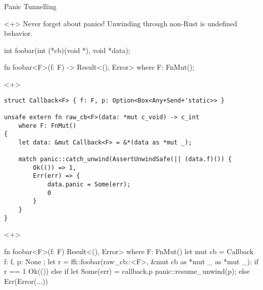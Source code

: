 \documentclass{beamer}
\begin{document}
\begin{frame}[fragile]{Panic Tunnelling}
    \begin{onlyenv}<+>
        Never forget about panics! Unwinding through non-Rust is undefined
        behavior.

        \begin{ccode}
int foobar(int (*cb)(void *), void *data);
        \end{ccode}
        \vspace{10pt}
        \begin{rustcode}
fn foobar<F>(f: F) -> Result<(), Error>
    where F: FnMut();
        \end{rustcode}
    \end{onlyenv}

    \begin{onlyenv}<+>
        \begin{verbatim}
struct Callback<F> { f: F, p: Option<Box<Any+Send+'static>> }

unsafe extern fn raw_cb<F>(data: *mut c_void) -> c_int
    where F: FnMut()
{
    let data: &mut Callback<F> = &*(data as *mut _);

    match panic::catch_unwind(AssertUnwindSafe(|| (data.f)()) {
        Ok(()) => 1,
        Err(err) => {
            data.panic = Some(err);
            0
        }
    }
}
        \end{verbatim}
    \end{onlyenv}

    \begin{onlyenv}<+>
        \begin{rustcode}
fn foobar<F>(f: F) Result<(), Error>
    where F: FnMut()
{
    let mut cb = Callback { f: f, p: None };
    let r = ffi::foobar(raw_cb::<F>,
                        &mut cb as *mut _ as *mut _);
    if r == 1 {
        Ok(())
    } else {
        if let Some(err) = callback.p {
            panic::resume_unwind(p);
        } else {
            Err(Error(...))
        }
    }
}
        \end{rustcode}
    \end{onlyenv}
\end{frame}
\end{document}
